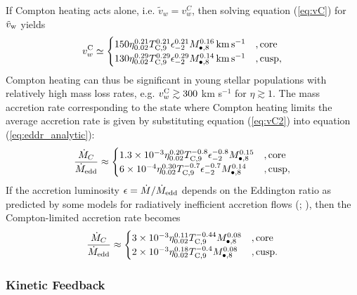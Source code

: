 \documentclass[usenatbib,fleqn]{mn2e}
\begin{document}
If Compton heating acts alone, i.e. $\tilde{v}_{w} = v_{w}^{C}$, then solving equation
(\ref{eq:vC}) for $\tilde{v}_{\rm w}$ yields
\begin{align} v_{w}^{\rm C} \simeq
  \begin{cases} 150 \eta_{0.02}^{0.21}T_{\rm
C,9}^{0.21}\epsilon_{-2}^{0.21} M_{\bullet,8}^{0.16}\,{\rm km\,s^{-1}}
&, \text{core}\\ 130 \eta_{0.02}^{0.29}T_{\rm
C,9}^{0.29}\epsilon_{-2}^{0.29} M_{\bullet,8}^{0.14}\,{\rm km\,s^{-1}}
&, \text{cusp},
  \end{cases}
  \label{eq:vC2}
\end{align} 
Compton heating can thus be significant in young stellar populations with relatively high mass loss rates, e.g. $v_{w}^{\rm C} \gtrsim 300$ km s$^{-1}$ for $\eta \gtrsim 1$.  The mass accretion rate corresponding to the state where Compton heating limits the average accretion rate is given by substituting equation (\ref{eq:vC2}) into equation (\ref{eq:eddr_analytic}):
\begin{align}
\frac{\dot{M}_{C}}{\dot{M}_{\rm edd}} \approx 
\begin{cases} 1.3\times 10^{-3} \eta_{0.02}^{0.20}T_{\rm
C,9}^{-0.8}\epsilon_{-2}^{-0.8} M_{\bullet,8}^{0.15}
&, \text{core}\\ 6\times 10^{-4} \eta_{0.02}^{0.30}T_{\rm
C,9}^{-0.7}\epsilon_{-2}^{-0.7} M_{\bullet,8}^{0.14}
&, \text{cusp},
  \end{cases}
  \label{eq:MdotCa}
\end{align}
If the accretion luminosity $\epsilon = \dot{M}/\dot{M}_{\rm edd}$ depends on the Eddington ratio as predicted by some models for radiatively inefficient accretion flows (\citealt{Narayan&Yi95}; \citealt{Narayan+98}), then the Compton-limited accretion rate becomes
\begin{align}
\frac{\dot{M}_{C}}{\dot{M}_{\rm edd}} \approx 
\begin{cases} 3\times 10^{-3} \eta_{0.02}^{0.11}T_{\rm
C,9}^{-0.44}M_{\bullet,8}^{0.08}
&, \text{core}\\ 2\times 10^{-3} \eta_{0.02}^{0.18}T_{\rm
C,9}^{-0.4} M_{\bullet,8}^{0.08}
&, \text{cusp}.
  \end{cases}
  \label{eq:MdotC}
\end{align}


\subsubsection{Kinetic Feedback}
\end{document}
